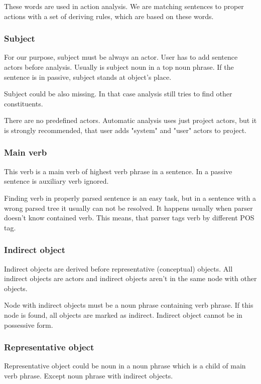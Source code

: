 These words are used in action analysis. We are matching sentences to proper actions with a set of deriving rules, which are based on these words. 
                                                                    
\subsubsection{Subject}
For our purpose, subject must be always an actor. User has to add sentence actors before analysis. Usually is subject noun in a top noun phrase. If the sentence is in passive, subject stands at object's place. 

Subject could be also missing. In that case analysis still tries to find other constituents.

There are no predefined actors. Automatic analysis uses just project actors, but it is strongly recommended, that user adds "system" and "user" actors to project.

\subsubsection{Main verb}
This verb is a main verb of highest verb phrase in a sentence. In a passive sentence is auxiliary verb ignored. 

Finding verb in properly parsed sentence is an easy task, but in a sentence with a wrong parsed tree it usually can not be resolved. It happens usually when parser doesn't know contained verb. This means, that parser tags verb by different POS tag.

\subsubsection{Indirect object}
Indirect objects are derived before representative (conceptual) objects. All indirect objects are actors and indirect objects aren't in the same node with other objects.

Node with indirect objects must be a noun phrase containing verb phrase. If this node is found, all objects are marked as indirect. Indirect object cannot be in possessive form.  

\subsubsection{Representative object}
Representative object could be noun in a noun phrase which is a child of main verb phrase. Except noun phrase with indirect objects.

